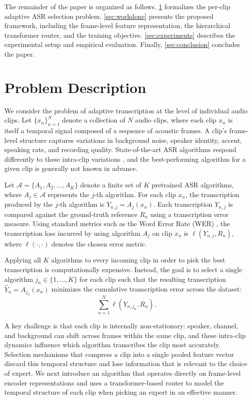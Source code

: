 \documentclass[journal]{IEEEtran}
\begin{document}
The remainder of the paper is organized as follows.
\cref{sec:problem} formalizes the per-clip adaptive ASR selection
problem. \cref{sec:workdone} presents the proposed framework,
including the frame-level feature representation, the hierarchical
transformer router, and the training objective.
\cref{sec:experiments} describes the experimental setup and empirical
evaluation. Finally, \cref{sec:conclusion} concludes the paper.

\section{Problem Description}
\label{sec:problem}

We consider the problem of adaptive transcription at the level of individual audio clips. Let $\{x_n\}_{n=1}^{N}$ denote a collection of $N$ audio clips, where each clip $x_n$ is itself a temporal signal composed of a sequence of acoustic frames. A clip's frame-level structure captures variations in background noise, speaker identity, accent, speaking rate, and recording quality. State-of-the-art ASR algorithms respond differently to these intra-clip variations \cite{li2014overviewrobust,cornell23_chime,bell2021adaptation}, and the best-performing algorithm for a given clip is generally not known in advance.

Let $\mathcal{A} = \{A_1, A_2, \ldots, A_K\}$ denote a finite set of $K$ pretrained ASR algorithms, where $A_j \in \mathcal{A}$ represents the $j$-th algorithm. For each clip $x_n$, the transcription produced by the $j$-th algorithm is $Y_{n,j} = A_j(x_n)$. Each transcription $Y_{n,j}$ is compared against the ground-truth reference $R_n$ using a transcription error measure. Using standard metrics such as the Word Error Rate (WER) \cite{li2014overviewrobust}, the transcription loss incurred by using algorithm $A_j$ on clip $x_n$ is $\ell(Y_{n,j}, R_n)$, where $\ell(\cdot,\cdot)$ denotes the chosen error metric.

Applying all $K$ algorithms to every incoming clip in order to pick the best transcription is computationally expensive. Instead, the goal is to select a single algorithm $j_n \in \{1,\dots,K\}$ for each clip such that the resulting transcription
$\hat{Y}_n = A_{j_n}(x_n)$ minimizes the cumulative transcription error across the dataset:
\begin{equation*}
\sum_{n=1}^{N} \ell(Y_{n,j_n}, R_n).
\end{equation*}

A key challenge is that each clip is internally non-stationary: speaker, channel, and background can shift across frames within the same clip, and these intra-clip dynamics influence which algorithm transcribes the clip most accurately. Selection mechanisms that compress a clip into a single pooled feature vector discard this temporal structure and lose information that is relevant to the choice of expert. We next introduce an algorithm that operates directly on frame-level encoder representations and uses a transformer-based router to model the temporal structure of each clip when picking an expert in an effective manner.
\end{document}
